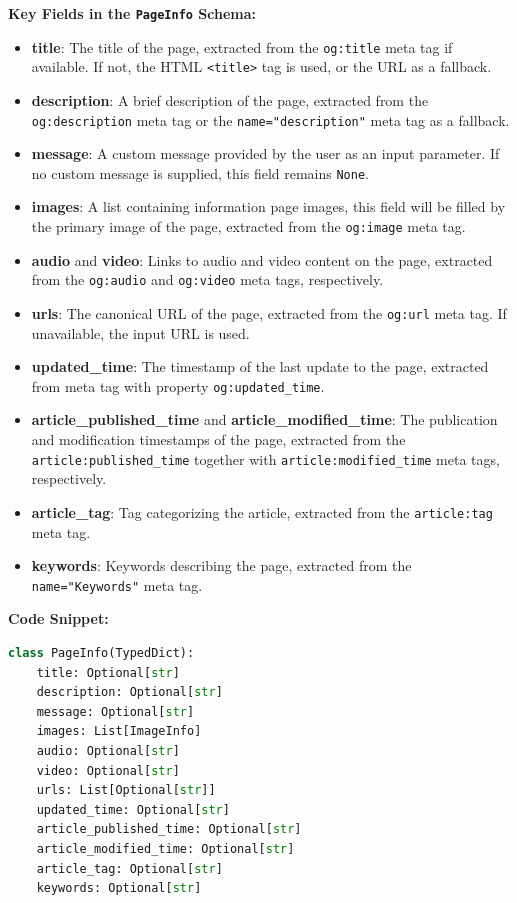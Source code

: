 \textbf{Key Fields in the \texttt{PageInfo} Schema:}
\begin{itemize}
    \item \textbf{title}: The title of the page, extracted from the \texttt{og:title} meta tag if available. If not, the HTML \texttt{<title>} tag is used, or the URL as a fallback.
    \item \textbf{description}: A brief description of the page, extracted from the \texttt{og:description} meta tag or the \texttt{name="description"} meta tag as a fallback.
    \item \textbf{message}: A custom message provided by the user as an input parameter. If no custom message is supplied, this field remains \texttt{None}.
    \item \textbf{images}: A list containing information page images, this field will be filled by the primary image of the page, extracted from the \texttt{og:image} meta tag.
    \item \textbf{audio} and \textbf{video}: Links to audio and video content on the page, extracted from the \texttt{og:audio} and \texttt{og:video} meta tags, respectively.
    \item \textbf{urls}: The canonical URL of the page, extracted from the \texttt{og:url} meta tag. If unavailable, the input URL is used.
    \item \textbf{updated\_time}: The timestamp of the last update to the page, extracted from meta tag with property  \texttt{og:updated\_time}.
    \item \textbf{article\_published\_time} and \textbf{article\_modified\_time}: The publication and modification timestamps of the page, extracted from the \texttt{article:published\_time} together with \texttt{article:modified\_time} meta tags, respectively.
    \item \textbf{article\_tag}: Tag categorizing the article, extracted from the \texttt{article:tag} meta tag.
    \item \textbf{keywords}: Keywords describing the page, extracted from the \texttt{name="Keywords"} meta tag.
\end{itemize}

\textbf{Code Snippet:}
\begin{lstlisting}[language=Python, caption={PageInfo Schema}, label={lst:pageinfo}]
class PageInfo(TypedDict):
    title: Optional[str]
    description: Optional[str]
    message: Optional[str]
    images: List[ImageInfo]
    audio: Optional[str]
    video: Optional[str]
    urls: List[Optional[str]]
    updated_time: Optional[str]
    article_published_time: Optional[str]
    article_modified_time: Optional[str]
    article_tag: Optional[str]
    keywords: Optional[str]
\end{lstlisting}

